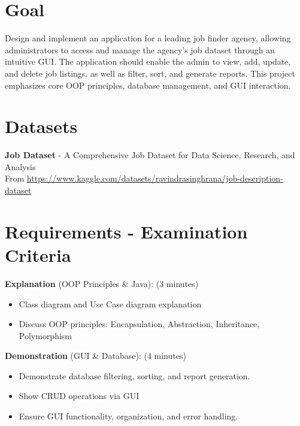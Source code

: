 \documentclass{article}
\begin{document}
\section*{Goal}
Design and implement an application for a leading job finder agency, allowing administrators to access and manage the agency’s job dataset through an intuitive GUI. The application should enable the admin to view, add, update, and delete job listings, as well as filter, sort, and generate reports. This project emphasizes core OOP principles, database management, and GUI interaction.

\section*{Datasets}
\textbf{Job Dataset} - A Comprehensive Job Dataset for Data Science, Research, and Analysis \\
From \url{https://www.kaggle.com/datasets/ravindrasinghrana/job-description-dataset}

\section*{Requirements - Examination Criteria}
\textbf{Explanation} (OOP Principles \& Java): (3 minutes)
\begin{itemize}
    \item Class diagram and Use Case diagram explanation
    \item Discuss OOP principles: Encapsulation, Abstraction, Inheritance, Polymorphism
\end{itemize}
\textbf{Demonstration} (GUI \& Database): (4 minutes)
\begin{itemize}
    \item Demonstrate database filtering, sorting, and report generation.
    \item Show CRUD operations via GUI
    \item Ensure GUI functionality, organization, and error handling.
\end{itemize}
\end{document}
